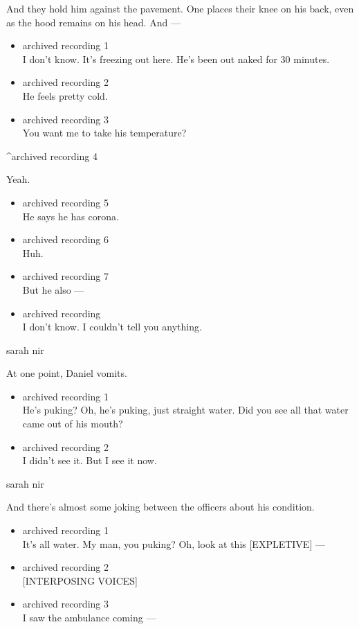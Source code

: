 And they hold him against the pavement. One places their knee on his
back, even as the hood remains on his head. And ---

\begin{itemize}
\item
  archived recording 1\\
  I don't know. It's freezing out here. He's been out naked for 30
  minutes.
\item
  archived recording 2\\
  He feels pretty cold.
\item
  archived recording 3\\
  You want me to take his temperature?
\end{itemize}

\^{}archived recording 4

Yeah.

\begin{itemize}
\item
  archived recording 5\\
  He says he has corona.
\item
  archived recording 6\\
  Huh.
\item
  archived recording 7\\
  But he also ---
\item
  archived recording\\
  I don't know. I couldn't tell you anything.
\end{itemize}

sarah nir

At one point, Daniel vomits.

\begin{itemize}
\item
  archived recording 1\\
  He's puking? Oh, he's puking, just straight water. Did you see all
  that water came out of his mouth?
\item
  archived recording 2\\
  I didn't see it. But I see it now.
\end{itemize}

sarah nir

And there's almost some joking between the officers about his condition.

\begin{itemize}
\item
  archived recording 1\\
  It's all water. My man, you puking? Oh, look at this {[}EXPLETIVE{]}
  ---
\item
  archived recording 2\\
  {[}INTERPOSING VOICES{]}
\item
  archived recording 3\\
  I saw the ambulance coming ---
\end{itemize}

